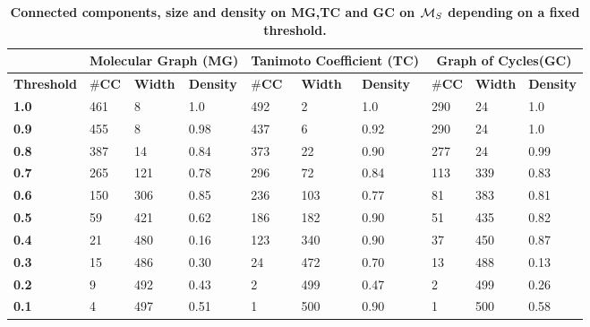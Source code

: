\documentclass[10pt,letterpaper]{article}
\begin{document}
\begin{table}[!ht]
\begin{adjustwidth}{-0.75in}{0in} %
\centering
\caption{
{\bf Connected components, size and density on MG,TC and GC on ${\cal M}_S$ depending on a fixed threshold.}}

\begin{tabular}{|p{1.5cm}|p{0.8cm}|p{0.8cm}|p{0.8cm}|p{0.8cm}|p{0.8cm}|p{0.8cm}|p{0.8cm}|p{0.8cm}|p{0.8cm}|}

 \hline

& \multicolumn{3}{c|}{\textbf{Molecular Graph (MG)}}&\multicolumn{3}{c|}{\textbf{Tanimoto Coefficient (TC)}}&\multicolumn{3}{c|}{\textbf{Graph of Cycles(GC)}}\\ \hline

\textbf{\footnotesize{Threshold}}& $\#$\textbf{\footnotesize{CC}}&\textbf{\footnotesize{Width}}&\textbf{\footnotesize{Density}}& $\#$\textbf{\footnotesize{CC}}&\textbf{\footnotesize{Width}}&\textbf{\footnotesize{Density}}& $\#$\textbf{\footnotesize{CC}}&\textbf{\footnotesize{Width}}&\textbf{\footnotesize{Density}}\\ \hline

\textbf{1.0} &461 &8 &1.0 &492 &2 &1.0 &290 &24 &1.0 \\ \hline

\textbf{0.9} &455 &8 &0.98 &437 &6&0.92&290 &24 &1.0 \\ \hline

\textbf{0.8} &387&14&0.84&373&22&0.90&277&24&0.99 \\ \hline

\textbf{0.7} &265&121&0.78&296&72&0.84&113&339&0.83 \\ \hline

\textbf{0.6} &150&306&0.85&236&103&0.77&81&383&0.81 \\ \hline

\textbf{0.5} &59&421&0.62&186&182&0.90&51&435&0.82 \\ \hline

\textbf{0.4} &21&480&0.16&123&340&0.90&37&450&0.87 \\ \hline

\textbf{0.3} &15&486&0.30&24&472&0.70&13&488&0.13 \\ \hline

\textbf{0.2} &9&492&0.43&2&499&0.47&2&499&0.26 \\ \hline

\textbf{0.1} &4&497&0.51&1&500&0.90&1&500&0.58 \\ \hline


\end{tabular}
\end{adjustwidth}
\end{table}
\end{document}
